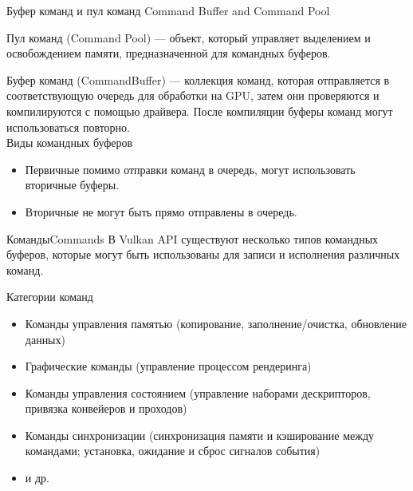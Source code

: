 \documentclass{beamer}
\begin{document}
	\begin{frame}{Буфер команд и пул команд} {Command Buffer and Command Pool}

		Пул команд (Command Pool) --- объект, который управляет выделением и освобождением памяти, предназначенной для командных буферов.

		Буфер команд (CommandBuffer) --- коллекция команд, которая отправляется в соответствующую очередь для обработки на GPU, затем они проверяются и компилируются с помощью драйвера.
		После компиляции буферы команд могут использоваться повторно.
		\\
		Виды командных буферов\\
		\begin{itemize}
			\item 
			Первичные помимо отправки команд в очередь, могут использовать вторичные буферы.
			\item 
			Вторичные не могут быть прямо отправлены в очередь.
		\end{itemize}
		
		

	\end{frame}

	\begin{frame}{Команды}{Commands}
		В Vulkan API существуют несколько типов командных буферов, которые могут быть использованы для записи и исполнения различных команд.

		Категории команд
		\begin{itemize}
			\item 
			Команды управления памятью (копирование, заполнение/очистка, обновление данных)
			\item
			Графические команды (управление процессом рендеринга)
			\item
			Команды управления состоянием (управление наборами дескрипторов, привязка конвейеров и проходов)
			\item
			Команды синхронизации (синхронизация памяти и кэширование между командами; установка, ожидание и сброс сигналов события)
			\item
			и др.
		\end{itemize}

	\end{frame}
\end{document}
